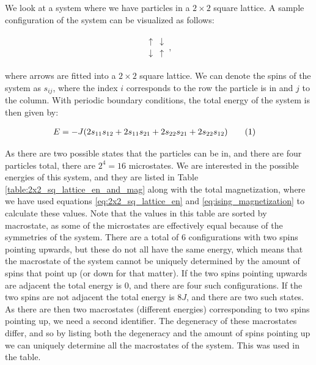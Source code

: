 \documentclass[reprint,english,notitlepage]{revtex4-1}  %
\newcommand\numberthis{\addtocounter{equation}{1}\tag{\theequation}}
\begin{document}
We look at a system where we have particles in a $2\times 2$ square lattice. A sample configuration of the system can be visualized as follows: \newline

\begin{align*}
\begin{array}{cc}
\uparrow & \downarrow \\
\downarrow & \uparrow
\end{array}  \, , 
\end{align*}


where arrows are fitted into a $2\times 2$ square lattice. We can denote the spins of the system as $s_{ij}$, where the index $i$ corresponds to the row the particle is in and $j$ to the column. With periodic boundary conditions, the total energy of the system is then given by:

\begin{align*}
E &= -J ( 2s_{11}s_{12} + 2s_{11}s_{21} + 2s_{22}s_{21} + 2s_{22}s_{12}) \numberthis \label{eq:2x2_sq_lattice_en}
\end{align*}

As there are two possible states that the particles can be in, and there are four particles total, there are $2^4 = 16$ microstates. We are interested in the possible energies of this system, and they are listed in Table \ref{table:2x2_sq_lattice_en_and_mag} along with the total magnetization, where we have used equations \eqref{eq:2x2_sq_lattice_en} and \eqref{eq:ising_magnetization} to calculate these values. Note that the values in this table are sorted by macrostate, as some of the microstates are effectively equal because of the symmetries of the system. There are a total of 6 configurations with two spins pointing upwards, but these do not all have the same energy, which means that the macrostate of the system cannot be uniquely determined by the amount of spins that point up (or down for that matter). If the two spins pointing upwards are adjacent the total energy is 0, and there are four such configurations. If the two spins are not adjacent the total energy is $8J$, and there are two such states. As there are then two macrostates (different energies) corresponding to two spins pointing up, we need a second identifier. The degeneracy of these macrostates differ, and so by listing both the degeneracy and the amount of spins pointing up we can uniquely determine all the macrostates of the system. This was used in the table.
\end{document}
